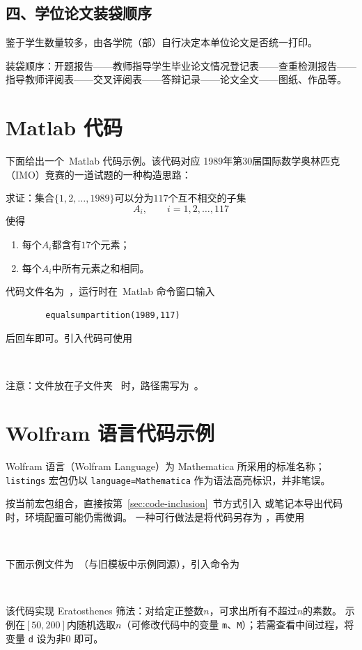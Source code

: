 \section*{四、学位论文装袋顺序}
鉴于学生数量较多，由各学院（部）自行决定本单位论文是否统一打印。

装袋顺序：开题报告——教师指导学生毕业论文情况登记表——查重检测报告——指导教师评阅表——交叉评阅表——答辩记录——论文全文——图纸、作品等。

\chapter{Matlab 代码}\label{app:code-matlab}
下面给出一个~Matlab 代码示例。该代码对应
1989年第30届国际数学奥林匹克（IMO）竞赛的一道试题的一种构造思路：\vspace{.5cm}

\noindent 求证：集合$\{1, 2, \ldots, 1989\}$可以分为$117$个互不相交的子集
\[A_i, \qquad i = 1, 2, \ldots, 117\]
使得
\begin{enumerate}[label=\arabic*., leftmargin=2em]
    \item 每个$A_i$都含有$17$个元素；
    \item 每个$A_i$中所有元素之和相同。
\end{enumerate}

代码文件名为~，运行时在~Matlab 命令窗口输入
\begin{verbatim}
        equalsumpartition(1989,117)
\end{verbatim}
后回车即可。引入代码可使用
\begin{verbatim}
       
\end{verbatim}
注意：文件放在子文件夹~ 时，路径需写为~。



\chapter{Wolfram 语言代码示例}\label{app:code-wolfram}
\begingroup
\hfuzz=1pt\relax
Wolfram 语言（Wolfram Language）为 Mathematica 所采用的标准名称；%
\texttt{listings} 宏包仍以%
\texttt{language=Mathematica}%
作为语法高亮标识，并非笔误。
\par\endgroup
按当前宏包组合，直接按第~\ref{sec:code-inclusion}~节方式引入  或笔记本导出代码时，环境配置可能仍需微调。
一种可行做法是将代码另存为 ，再使用
\begin{verbatim}
        
\end{verbatim}
下面示例文件为~（与旧模板中示例同源），引入命令为
\begin{verbatim}
       
\end{verbatim}
该代码实现 Eratosthenes 筛法：对给定正整数$n$，可求出所有不超过$n$的素数。
示例在$[50,200]$内随机选取$n$（可修改代码中的变量 \texttt{m}、\texttt{M}）；若需查看中间过程，将变量 \texttt{d} 设为非$0$ 即可。


